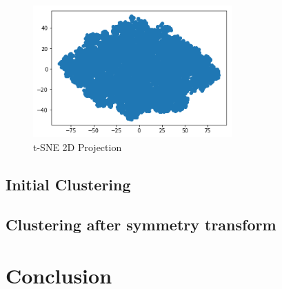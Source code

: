 \documentclass{article} %
\begin{document}
\begin{figure}[H]
	\centering
	\includegraphics[width=3in]{Figures/ul0.png}
	\caption{t-SNE 2D Projection}
	\label{fig:tsne}
\end{figure}

\subsection{Initial Clustering}

\subsection{Clustering after symmetry transform}

\section{Conclusion}

\small{
\printbibliography
}
\end{document}
